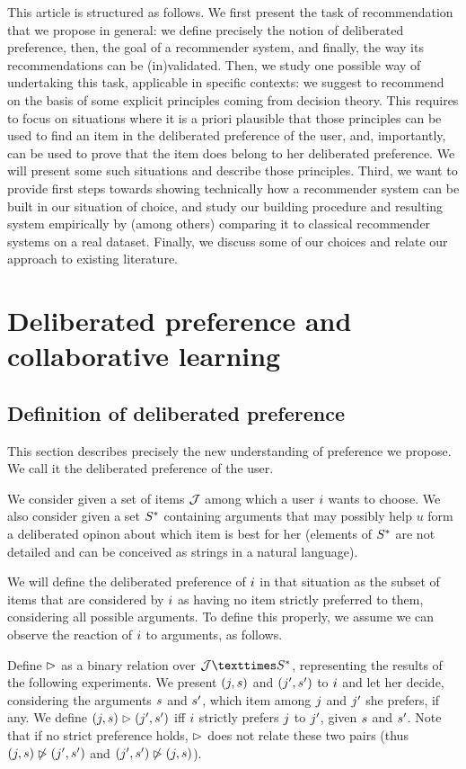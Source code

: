 \documentclass[french, english]{da2pl2018}
\begin{document}
This article is structured as follows. We first present the task of recommendation that we propose in general: we define precisely the notion of deliberated preference, then, the goal of a recommender system, and finally, the way its recommendations can be (in)validated. Then, we study one possible way of undertaking this task, applicable in specific contexts: we suggest to recommend on the basis of some explicit principles coming from decision theory. This requires to focus on situations where it is a priori plausible that those principles can be used to find an item in the deliberated preference of the user, and, importantly, can be used to prove that the item does belong to her deliberated preference. We will present some such situations and describe those principles. Third, we want to provide first steps towards showing technically how a recommender system can be built in our situation of choice, and study our building procedure and resulting system empirically by (among others) comparing it to classical recommender systems on a real dataset. Finally, we discuss some of our choices and relate our approach to existing literature.

\section{Deliberated preference and collaborative learning}
\subsection{Definition of deliberated preference}
This section describes precisely the new understanding of preference we propose. We call it the deliberated preference of the user.

We consider given a set of items $\mathcal{J}$ among which a user $i$ wants to choose. We also consider given a set $S^*$ containing arguments that may possibly help $u$ form a deliberated opinon about which item is best for her (elements of $S^*$ are not detailed and can be conceived as strings in a natural language). 

We will define the deliberated preference of $i$ in that situation as the subset of items that are considered by $i$ as having no item strictly preferred to them, considering all possible arguments. To define this properly, we assume we can observe the reaction of $i$ to arguments, as follows. 

Define $\vartriangleright$ as a binary relation over $\allitems × \allargs$, representing the results of the following experiments. We present $(j, s)$ and $(j', s')$ to $i$ and let her decide, considering the arguments $s$ and $s'$, which item among $j$ and $j'$ she prefers, if any. 
We define $(j, s) \vartriangleright (j', s')$ iff $i$ strictly prefers $j$ to $j'$, given $s$ and $s'$. Note that if no strict preference holds, $\vartriangleright$ does not relate these two pairs (thus $(j, s) \not\vartriangleright (j', s')$ and $(j', s') \not\vartriangleright (j, s)$). 
\end{document}
